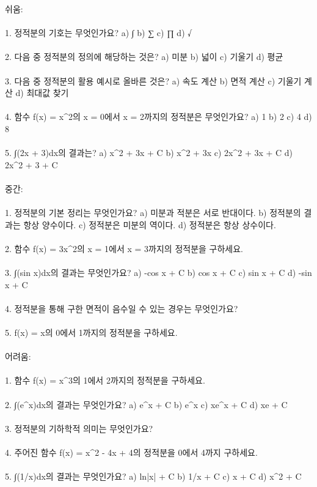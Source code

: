 \documentclass[fleqn]{article}
\begin{document}
      
        쉬움: \\\\  
1. 정적분의 기호는 무엇인가요?  
   a) ∫  
   b) ∑  
   c) ∏  
   d) √ \\\\  
2. 다음 중 정적분의 정의에 해당하는 것은?  
   a) 미분  
   b) 넓이  
   c) 기울기  
   d) 평균 \\\\  
3. 다음 중 정적분의 활용 예시로 올바른 것은?  
   a) 속도 계산  
   b) 면적 계산  
   c) 기울기 계산  
   d) 최대값 찾기 \\\\  
4. 함수 f(x) = x^2의 x = 0에서 x = 2까지의 정적분은 무엇인가요?  
   a) 1  
   b) 2  
   c) 4  
   d) 8 \\\\  
5. ∫(2x + 3)dx의 결과는?  
   a) x^2 + 3x + C  
   b) x^2 + 3x  
   c) 2x^2 + 3x + C  
   d) 2x^2 + 3 + C \\\\

중간: \\\\  
1. 정적분의 기본 정리는 무엇인가요?  
   a) 미분과 적분은 서로 반대이다.  
   b) 정적분의 결과는 항상 양수이다.  
   c) 정적분은 미분의 역이다.  
   d) 정적분은 항상 상수이다. \\\\  
2. 함수 f(x) = 3x^2의 x = 1에서 x = 3까지의 정적분을 구하세요. \\\\  
3. ∫(sin x)dx의 결과는 무엇인가요?  
   a) -cos x + C  
   b) cos x + C  
   c) sin x + C  
   d) -sin x + C \\\\  
4. 정적분을 통해 구한 면적이 음수일 수 있는 경우는 무엇인가요? \\\\  
5. f(x) = x의 0에서 1까지의 정적분을 구하세요. \\\\  

어려움: \\\\  
1. 함수 f(x) = x^3의 1에서 2까지의 정적분을 구하세요. \\\\  
2. ∫(e^x)dx의 결과는 무엇인가요?  
   a) e^x + C  
   b) e^x  
   c) xe^x + C  
   d) xe + C \\\\  
3. 정적분의 기하학적 의미는 무엇인가요? \\\\  
4. 주어진 함수 f(x) = x^2 - 4x + 4의 정적분을 0에서 4까지 구하세요. \\\\  
5. ∫(1/x)dx의 결과는 무엇인가요?  
   a) ln|x| + C  
   b) 1/x + C  
   c) x + C  
   d) x^2 + C \\\\  

      
        
\end{document}
